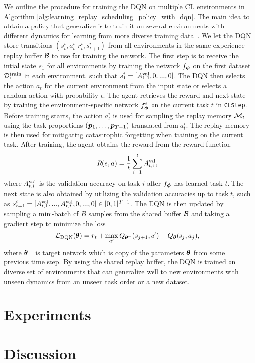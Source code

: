 We outline the procedure for training the DQN on multiple CL environments in Algorithm \ref{alg:learning_replay_scheduling_policy_with_dqn}. The main idea to obtain a policy that generalize is to train it on several environments with different dynamics for learning from more diverse training data~\cite{zhang2018dissection}. We let the DQN store transitions $(s_{t}^{i}, a_{t}^{i}, r_{t}^{i}, s_{t+1}^{i})$ from all environments in the same experience replay buffer ${\mathcal{B}}$ to use for training the network. The first step is to receive the intial state $s_1$ for all environments by training the network $f_{{\bm{\phi}}}$ on the first dataset ${\mathcal{D}}_1^{{\text{train}}}$ in each environment, such that $s_{1}^{i} = [A_{1,1}^{{\text{val}}}, 0, ..., 0]$. The DQN then selects the action $a_t$ for the current environment from the input state or selects a random action with probability $\epsilon$. The agent retrieves the reward and next state by training the environment-specific network $f_{{\bm{\phi}}}^{i}$ on the current task $t$ in \texttt{CLStep}. Before training starts, the action $a_{t}^{i}$ is used for sampling the replay memory ${\mathcal{M}}_t$ using the task proportions $({\bm{p}}_1, \dots, {\bm{p}}_{T-1})$ translated from $a_{t}^{i}$. The replay memory is then used for mitigating catastrophic forgetting when training on the current task. After training, the agent obtains the reward from the reward function 
\begin{align}
	R(s, a) = \frac{1}{t} \sum_{i=1}^{t} A_{t, i}^{{\text{val}}},
\end{align}
where $A_{t, i}^{{\text{val}}}$ is the validation accuracy on task $i$ after $f_{{\bm{\phi}}}$ has learned task $t$. The next state is also obtained by utilizing the validation accuracies up to task $t$, such as $s_{t+1}^{i} = [A_{t, 1}^{{\text{val}}}, ..., A_{t, t}^{{\text{val}}}, 0, ..., 0] \in [0, 1]^{T-1}$. The DQN is then updated by sampling a mini-batch of $B$ samples from the shared buffer ${\mathcal{B}}$ and taking a gradient step to minimize the loss
\begin{align}
	{\mathcal{L}}_{\text{DQN}}({\bm{\theta}}) = r_t + \max_{a'} Q_{{\bm{\theta}}^{-}}(s_{j+1}, a') - Q_{{\bm{\theta}}}(s_j, a_j), 
\end{align}  
where ${\bm{\theta}}^{-}$ is target network which is copy of the parameters ${\bm{\theta}}$ from some previous time step. By using the shared replay buffer, the DQN is trained on diverse set of environments that can generalize well to new environments with unseen dynamics from an unseen task order or a new dataset. 





\section{Experiments}


\section{Discussion}



